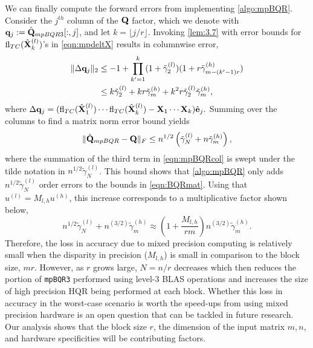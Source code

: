 We can finally compute the forward errors from implementing \cref{algo:mpBQR}.
Consider the $j^{th}$ column of the $\mathbf{Q}$ factor, which we denote with $\mathbf{q}_j:=\hat{\mathbf{Q}}_{mpBQR3}[:,j]$, and let $k = \lfloor j/r\rfloor$.
Invoking \cref{lem:3.7} with error bounds for $\mathrm{fl}_{TC}(\hat{\mathbf{X}}_k^{(l)})$'s in \cref{eqn:mpdeltX} results in columnwise error,
\begin{align}
	\|\Delta \bb{q}_j \|_2 &\leq -1 + \prod_{k'=1}^k (1+\tilde{\gamma}_2^{(l)})(1+r\tilde{\gamma}_{m-(k'-1)r}^{(h)})\\ 
	&\leq k\tilde{\gamma}_{2}^{(l)} + kr\tilde{\gamma}_m^{(h)} + k^2r\tilde{\gamma}_{2}^{(l)}\tilde{\gamma}_m^{(h)}, \label{eqn:mpBQRcol}
\end{align} 
where $\Delta \mathbf{q}_j = (\mathrm{fl}_{TC}(\hat{\mathbf{X}}_1^{(l)})\cdots\mathrm{fl}_{TC}(\hat{\mathbf{X}}_k^{(l)}) - \mathbf{X}_1\cdots\mathbf{X}_k )\hat{\mathbf{e}}_j.$
Summing over the columns to find a matrix norm error bound yields
\begin{equation}
	\|\hat{\mathbf{Q}}_{mpBQR}-\mathbf{Q}\|_F \leq n^{1/2}\left(\tilde{\gamma}_{N}^{(l)} + n\tilde{\gamma}_m^{(h)}\right),
\end{equation}
where the summation of the third term in \cref{eqn:mpBQRcol} is swept under the tilde notation in $n^{1/2} \tilde{\gamma}_{N}^{(l)}$.
This bound shows that \cref{algo:mpBQR} only adds $n^{1/2}\tilde{\gamma}_{N}^{(l)}$ order errors to the bounds in \cref{eqn:BQRmat}.
Using that $u^{(l)}=M_{l,h}u^{(h)}$, this increase corresponds to a multiplicative factor shown below,
\begin{equation}
	n^{1/2}\tilde{\gamma}_{N}^{(l)} + n^{(3/2)}\tilde{\gamma}_m^{(h)} \approx \left(1+\frac{M_{l,h}}{rm}\right)n^{(3/2)}\tilde{\gamma}_m^{(h)}. \label{eqn:mpBQR3}
\end{equation}
Therefore, the loss in accuracy due to mixed precision computing is relatively small when the disparity in precision ($M_{l,h}$) is small in comparison to the block size, $mr$.
However, as $r$ grows large, $N=n/r$ decreases which then reduces the portion of {\tt mpBQR3} performed using level-3 BLAS operations and increases the size of high precision HQR being performed at each block.
Whether this loss in accuracy in the worst-case scenario is worth the speed-ups from using mixed precision hardware is an open question that can be tackled in future research.
Our analysis shows that the block size $r$, the dimension of the input matrix $m,n$, and hardware specificities will be contributing factors. 

